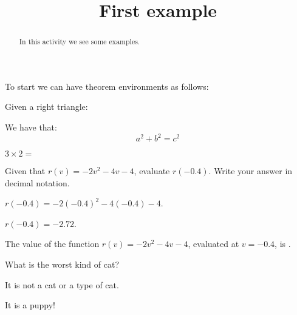 \documentclass{ximera}
\title{First example}
\begin{document}
\begin{abstract}
In this activity we see some examples.
\end{abstract}
\maketitle

To start we can have theorem environments as follows:

\begin{theorem}
Given a right triangle:
\begin{image}
\end{image}
We have that:
\[
a^2 + b^2 = c^2
\]
\end{theorem}

\begin{exercise}
$3\times 2=$
\end{exercise}


\begin{exercise}
Given that $r(v)=-2 v^2-4 v-4$, evaluate $r(-0.4)$. Write your answer in decimal notation.
\begin{hint}
$r(-0.4)=-2 (-0.4)^2-4 (-0.4)-4$.
\end{hint}
\begin{hint}
$r(-0.4)=-2.72$.
\end{hint}

The value of the function $r(v)=-2 v^2-4 v-4$, evaluated at $v=-0.4$, is .
\end{exercise}



\begin{question}
What is the worst kind of cat?
\begin{prompt}
\begin{multipleChoice}
\end{multipleChoice}
\end{prompt}
\begin{hint}
It is not a cat or a type of cat.
\end{hint}
\begin{hint}
It is a puppy!
\end{hint}
\end{question}
\end{document}
